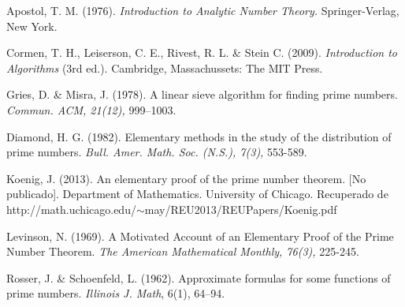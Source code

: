 \documentclass[10pt]{article}
\theoremstyle{definition}
\theoremstyle{remark}
\begin{document}
\newpage

\begin{thebibliography}{6}
Apostol, T. M. (1976).
\textit{Introduction to Analytic Number Theory.}
Springer-Verlag, New York.

Cormen, T. H., Leiserson, C. E., Rivest, R. L. \& Stein C. (2009).
\textit{Introduction to Algorithms} (3rd ed.).
Cambridge, Massachussets: The MIT Press.

Gries, D. \& Misra, J. (1978).
A linear sieve algorithm for finding prime numbers.
\textit{Commun. ACM, 21(12),} 999–1003.%

Diamond, H. G. (1982).
Elementary methods in the study of the distribution of prime numbers. 
\textit{Bull. Amer. Math. Soc. (N.S.), 7(3),} 553-589.%

Koenig, J. (2013).
An elementary proof of the prime number theorem. [No publicado].
Department of Mathematics. University of Chicago. 
Recuperado de http://math.uchicago.edu/$\sim$may/REU2013/REUPapers/Koenig.pdf

Levinson, N. (1969).
A Motivated Account of an Elementary Proof of the Prime Number Theorem.
\textit{The American Mathematical Monthly, 76(3),} 225-245.

Rosser, J. \& Schoenfeld, L. (1962). 
Approximate formulas for some functions of prime numbers. \textit{Illinois J. Math}, 6(1), 64--94.%
\end{thebibliography}
\end{document}
